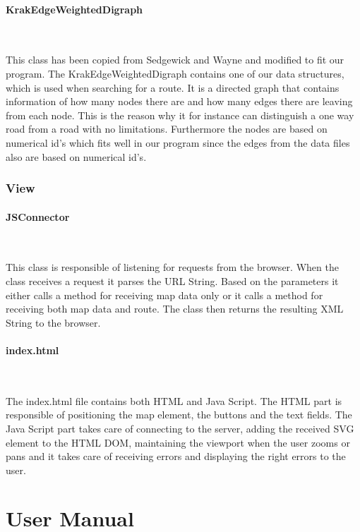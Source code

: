 \documentclass[a4paper,10pt,titlepage]{article}
\begin{document}
				\paragraph{KrakEdgeWeightedDigraph \cite{sedgewickAndWayneEdgeWeightedDigraph}}\mbox{}\
				

This class has been copied from Sedgewick and Wayne and modified to fit our program. The KrakEdgeWeightedDigraph contains one of our data structures, which is used when searching for a route. It is a directed graph that contains information of how many nodes there are and how many edges there are leaving from each node. This is the reason why it for instance can distinguish a one way road from a road with no limitations. Furthermore the nodes are based on numerical id’s which fits well in our program since the edges from the data files also are based on numerical id’s. \\

			\newpage	
			\subsubsection{View}
			
				\paragraph{JSConnector}\mbox{}\
				
				This class is responsible of listening for requests from the browser. When the class receives a request it parses the URL String. Based on the parameters it either calls a method for receiving map data only or it calls a method for receiving both map data and route. The class then returns the resulting XML String to the browser. 
						
				\paragraph{index.html}\mbox{}\
				
				The index.html file contains both HTML and Java Script. The HTML part is responsible of positioning the map element, the buttons and the text fields. The Java Script part takes care of connecting to the server, adding the received SVG element to the HTML DOM, maintaining the viewport when the user zooms or pans and it takes care of receiving errors and displaying the right errors to the user. 

	\newpage
	\section{User Manual}
\end{document}
